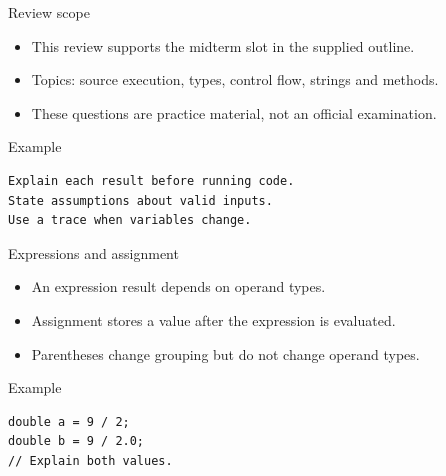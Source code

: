 \documentclass[10pt,aspectratio=169]{beamer}
\begin{document}
\begin{frame}[fragile,t]{Review scope}
\begin{itemize}
\item This review supports the midterm slot in the supplied outline.
\item Topics: source execution, types, control flow, strings and methods.
\item These questions are practice material, not an official examination.
\end{itemize}
\vspace{1mm}\begin{block}{Example}
\begin{lstlisting}
Explain each result before running code.
State assumptions about valid inputs.
Use a trace when variables change.
\end{lstlisting}
\end{block}
\end{frame}

\begin{frame}[fragile,t]{Expressions and assignment}
\begin{itemize}
\item An expression result depends on operand types.
\item Assignment stores a value after the expression is evaluated.
\item Parentheses change grouping but do not change operand types.
\end{itemize}
\vspace{1mm}\begin{block}{Example}
\begin{lstlisting}
double a = 9 / 2;
double b = 9 / 2.0;
// Explain both values.
\end{lstlisting}
\end{block}
\end{frame}
\end{document}
